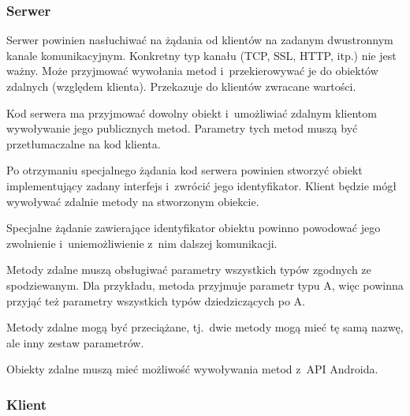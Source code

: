 \subsubsection{Serwer}

\begin{description}

Serwer powinien nasłuchiwać na żądania od klientów na zadanym dwustronnym kanale komunikacyjnym.
Konkretny typ kanału (TCP, SSL, HTTP, itp.) nie jest ważny.
Może przyjmować wywołania metod i~przekierowywać je do obiektów zdalnych (względem klienta).
Przekazuje do klientów zwracane wartości.

Kod serwera ma przyjmować dowolny obiekt i~umożliwiać zdalnym klientom wywoływanie jego publicznych metod.
Parametry tych metod muszą być przetłumaczalne na kod klienta.

Po otrzymaniu specjalnego żądania kod serwera powinien stworzyć obiekt implementujący zadany interfejs i~zwrócić jego identyfikator. Klient będzie mógł wywoływać zdalnie metody na stworzonym obiekcie.

Specjalne żądanie zawierające identyfikator obiektu powinno powodować jego zwolnienie i~uniemożliwienie z~nim dalszej komunikacji.

Metody zdalne muszą obsługiwać parametry wszystkich typów zgodnych ze spodziewanym. Dla przykładu, metoda przyjmuje parametr typu A, więc powinna przyjąć też parametry wszystkich typów dziedziczących po A.

Metody zdalne mogą być przeciążane, tj.\ dwie metody mogą mieć tę samą nazwę, ale inny zestaw parametrów.

Obiekty zdalne muszą mieć możliwość wywoływania metod z~API Androida.

\end{description}

\subsubsection{Klient}

